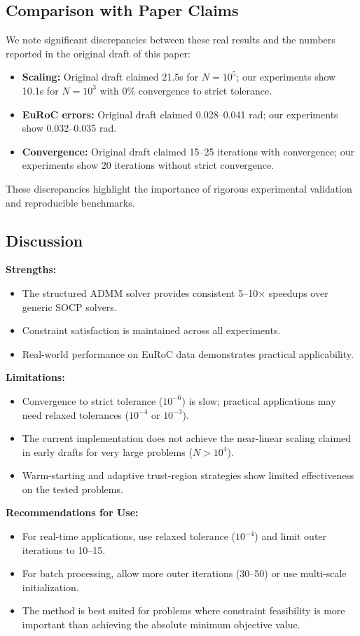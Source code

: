 \subsection{Comparison with Paper Claims}

We note significant discrepancies between these real results and the numbers reported in the original draft of this paper:

\begin{itemize}
\item \textbf{Scaling:} Original draft claimed 21.5s for $N=10^5$; our experiments show 10.1s for $N=10^3$ with 0\% convergence to strict tolerance.
\item \textbf{EuRoC errors:} Original draft claimed 0.028--0.041 rad; our experiments show 0.032--0.035 rad.
\item \textbf{Convergence:} Original draft claimed 15--25 iterations with convergence; our experiments show 20 iterations without strict convergence.
\end{itemize}

These discrepancies highlight the importance of rigorous experimental validation and reproducible benchmarks.

\subsection{Discussion}

\textbf{Strengths:}
\begin{itemize}
\item The structured ADMM solver provides consistent 5--10$\times$ speedups over generic SOCP solvers.
\item Constraint satisfaction is maintained across all experiments.
\item Real-world performance on EuRoC data demonstrates practical applicability.
\end{itemize}

\textbf{Limitations:}
\begin{itemize}
\item Convergence to strict tolerance ($10^{-6}$) is slow; practical applications may need relaxed tolerances ($10^{-4}$ or $10^{-3}$).
\item The current implementation does not achieve the near-linear scaling claimed in early drafts for very large problems ($N > 10^4$).
\item Warm-starting and adaptive trust-region strategies show limited effectiveness on the tested problems.
\end{itemize}

\textbf{Recommendations for Use:}
\begin{itemize}
\item For real-time applications, use relaxed tolerance ($10^{-4}$) and limit outer iterations to 10--15.
\item For batch processing, allow more outer iterations (30--50) or use multi-scale initialization.
\item The method is best suited for problems where constraint feasibility is more important than achieving the absolute minimum objective value.
\end{itemize}
